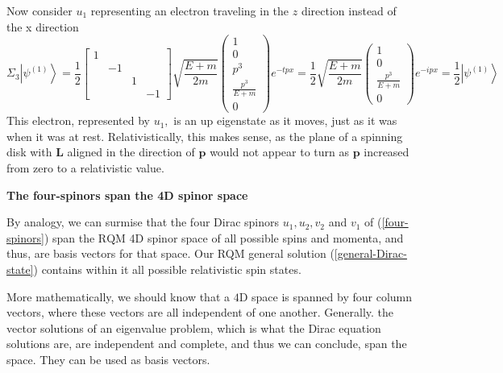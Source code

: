 Now consider $u_1$ representing an electron traveling in the $z$ direction instead of the x direction
$$
\Sigma_{3}\left|\psi^{(1)}\right\rangle=\frac{1}{2}\left[\begin{array}{cccc}
{1} \\
{} & {-1} \\
{} & {} & {1} \\
{} & {} & {} & {-1}
\end{array}\right]\sqrt{\frac{E+m}{2 m}}\left(\begin{array}{c}
{1} \\
{0} \\
{p^{3}} \\
{\frac{p^{3}}{E+m}} \\
{0}
\end{array}\right) e^{-t p x}=\frac{1}{2} \sqrt{\frac{E+m}{2 m}}\left(\begin{array}{c}
{1} \\
{0} \\
{\frac{p^{3}}{E+m}} \\
{0}
\end{array}\right) e^{-i p x}=\frac{1}{2}\left|\psi^{(1)}\right\rangle
$$
This electron, represented by $u_{1},$ is an up eigenstate as it moves, just as it was when it was at rest. Relativistically, this makes sense, as the plane of a spinning disk with $\mathbf{L}$ aligned in the direction of $\mathbf{p}$ would not appear to turn as $\mathbf{p}$ increased from zero to a relativistic value.


\begin{mybox}
\textbf{The four-spinors span the 4D spinor space}

By analogy, we can surmise that the four Dirac spinors $u_{1}, u_{2}, v_{2}$ and $v_{1}$ of (\ref{four-spinors}) span the $\mathrm{RQM}$ 4D spinor space of all possible spins and momenta, and thus, are basis vectors for that space. Our RQM general solution (\ref{general-Dirac-state}) contains within it all possible relativistic spin states.

More mathematically, we should know that a $4 \mathrm{D}$ space is spanned by four column vectors, where these vectors are all independent of one another. Generally. the vector solutions of an eigenvalue problem, which is what the Dirac equation solutions are, are independent and complete, and thus we can conclude, span the space. They can be used as basis vectors.
\end{mybox}
